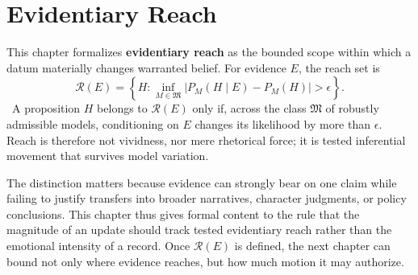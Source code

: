
\chapter{Evidentiary Reach}
\label{ch:ch073}

This chapter formalizes \textbf{evidentiary reach} as the bounded scope within which a datum materially changes warranted belief. For evidence \(E\), the reach set is
\[
\mathcal R(E)
=
\left\{
H:
\inf_{M\in\mathfrak M}
\left|
P_M(H\mid E)-P_M(H)
\right|>\epsilon
\right\}.
\]
\Definition\ A proposition \(H\) belongs to \(\mathcal R(E)\) only if, across the class \(\mathfrak M\) of robustly admissible models, conditioning on \(E\) changes its likelihood by more than \(\epsilon\). Reach is therefore not vividness, nor mere rhetorical force; it is tested inferential movement that survives model variation.

The distinction matters because evidence can strongly bear on one claim while failing to justify transfers into broader narratives, character judgments, or policy conclusions. This chapter thus gives formal content to the rule that the magnitude of an update should track tested evidentiary reach rather than the emotional intensity of a record. Once \(\mathcal R(E)\) is defined, the next chapter can bound not only where evidence reaches, but how much motion it may authorize.
